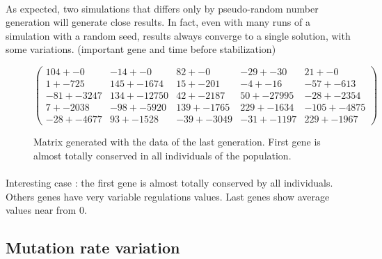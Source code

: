 \documentclass[]{report} %
\begin{document}
    \paragraph*{}
    As expected, two simulations that differs only by pseudo-random number generation will generate close results. 
    In fact, even with many runs of a simulation with a random seed, results always converge to a single solution, with some variations.
    (important gene and time before stabilization)

    \begin{figure}[H] 
            \centering
            \small
    $
            \begin{pmatrix}
                104 +- 0 & -14 +- 0 & 82 +- 0 & -29 +- 30 & 21 +- 0 \\
                1 +- 725 & 145 +- 1674 & 15 +- 201 & -4 +- 16 & -57 +- 613 \\
                -81 +- 3247 & 134 +- 12750 & 42 +- 2187 & 50 +- 27995 & -28 +- 2354 \\
                7 +- 2038 & -98 +- 5920 & 139 +- 1765 & 229 +- 1634 & -105 +- 4875 \\
                -28 +- 4677 & 93 +- 1528 & -39 +- 3049 & -31 +- 1197 & 229 +- 1967 
            \end{pmatrix}
    $
            \caption{\footnotesize Matrix generated with the data of the last generation. First gene is almost totally conserved in all individuals of the population.}
            \label{mat:telltaleAlt}
    \end{figure}
    \paragraph*{}
    Interesting case : the first gene is almost totally conserved by all individuals. Others genes have very variable regulations values.
    Last genes show average values near from 0.
    


\subsection{Mutation rate variation}
\end{document}
